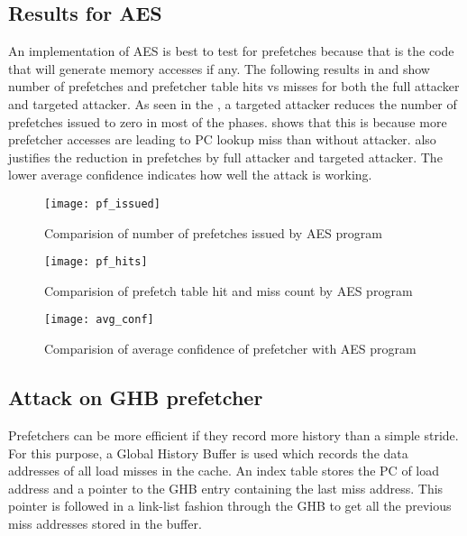 \subsection{Results for AES}

An implementation of AES is best to test for prefetches because that is the code
that will generate memory accesses if any. The following results
in  and  show
number of prefetches and prefetcher table hits vs misses for both
the full attacker and targeted attacker.
As seen in the , a targeted attacker
reduces the number of prefetches issued to zero in most of the phases.
 shows that this is because more
prefetcher accesses are leading to PC lookup miss than without attacker.
 also justifies the reduction in prefetches
by full attacker and targeted attacker.
The lower average confidence indicates how well the attack is working.

\begin{figure}[h]
    \centering
    \texttt{[image: pf\_issued]}
    \caption{Comparision of number of prefetches issued by AES program}
    \label{fig:targeted_attack}
\end{figure}

\begin{figure}[h]
    \centering
    \texttt{[image: pf\_hits]}
    \caption{Comparision of prefetch table hit and miss count by AES program}
    \label{fig:targeted_hitrate}
\end{figure}

\begin{figure}[h]
    \centering
    \texttt{[image: avg\_conf]}
    \caption{Comparision of average confidence of prefetcher with AES program}
    \label{fig:targeted_avgconf}
\end{figure}

\subsection{Attack on GHB prefetcher}

Prefetchers can be more efficient if they record more history than
a simple stride. For this purpose, a Global History Buffer is used which
records the data addresses of all load misses in the cache.
An index table stores the PC of load address and a pointer to the GHB
entry containing the last miss address. This pointer is followed in a link-list
fashion through the GHB to get all the previous miss addresses stored
in the buffer.

